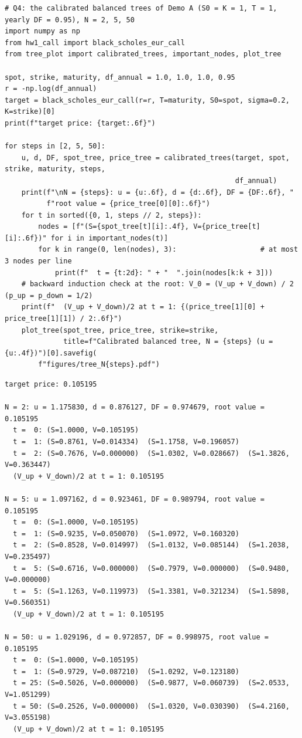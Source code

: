 \documentclass[11pt,a4paper]{article}
\begin{document}
\par\smallskip\noindent\begin{minipage}{\linewidth}\begin{lstlisting}[style=pysmall,title={run (\texttt{trees\_demo.py})}]
# Q4: the calibrated balanced trees of Demo A (S0 = K = 1, T = 1, yearly DF = 0.95), N = 2, 5, 50
import numpy as np
from hw1_call import black_scholes_eur_call
from tree_plot import calibrated_trees, important_nodes, plot_tree

spot, strike, maturity, df_annual = 1.0, 1.0, 1.0, 0.95
r = -np.log(df_annual)
target = black_scholes_eur_call(r=r, T=maturity, S0=spot, sigma=0.2, K=strike)[0]
print(f"target price: {target:.6f}")

for steps in [2, 5, 50]:
    u, d, DF, spot_tree, price_tree = calibrated_trees(target, spot, strike, maturity, steps,
                                                       df_annual)
    print(f"\nN = {steps}: u = {u:.6f}, d = {d:.6f}, DF = {DF:.6f}, "
          f"root value = {price_tree[0][0]:.6f}")
    for t in sorted({0, 1, steps // 2, steps}):
        nodes = [f"(S={spot_tree[t][i]:.4f}, V={price_tree[t][i]:.6f})" for i in important_nodes(t)]
        for k in range(0, len(nodes), 3):                    # at most 3 nodes per line
            print(f"  t = {t:2d}: " + "  ".join(nodes[k:k + 3]))
    # backward induction check at the root: V_0 = (V_up + V_down) / 2 (p_up = p_down = 1/2)
    print(f"  (V_up + V_down)/2 at t = 1: {(price_tree[1][0] + price_tree[1][1]) / 2:.6f}")
    plot_tree(spot_tree, price_tree, strike=strike,
              title=f"Calibrated balanced tree, N = {steps} (u = {u:.4f})")[0].savefig(
        f"figures/tree_N{steps}.pdf")
\end{lstlisting}
\begin{lstlisting}[style=out,title={output (\texttt{trees\_demo.out})}]
target price: 0.105195

N = 2: u = 1.175830, d = 0.876127, DF = 0.974679, root value = 0.105195
  t =  0: (S=1.0000, V=0.105195)
  t =  1: (S=0.8761, V=0.014334)  (S=1.1758, V=0.196057)
  t =  2: (S=0.7676, V=0.000000)  (S=1.0302, V=0.028667)  (S=1.3826, V=0.363447)
  (V_up + V_down)/2 at t = 1: 0.105195

N = 5: u = 1.097162, d = 0.923461, DF = 0.989794, root value = 0.105195
  t =  0: (S=1.0000, V=0.105195)
  t =  1: (S=0.9235, V=0.050070)  (S=1.0972, V=0.160320)
  t =  2: (S=0.8528, V=0.014997)  (S=1.0132, V=0.085144)  (S=1.2038, V=0.235497)
  t =  5: (S=0.6716, V=0.000000)  (S=0.7979, V=0.000000)  (S=0.9480, V=0.000000)
  t =  5: (S=1.1263, V=0.119973)  (S=1.3381, V=0.321234)  (S=1.5898, V=0.560351)
  (V_up + V_down)/2 at t = 1: 0.105195

N = 50: u = 1.029196, d = 0.972857, DF = 0.998975, root value = 0.105195
  t =  0: (S=1.0000, V=0.105195)
  t =  1: (S=0.9729, V=0.087210)  (S=1.0292, V=0.123180)
  t = 25: (S=0.5026, V=0.000000)  (S=0.9877, V=0.060739)  (S=2.0533, V=1.051299)
  t = 50: (S=0.2526, V=0.000000)  (S=1.0320, V=0.030390)  (S=4.2160, V=3.055198)
  (V_up + V_down)/2 at t = 1: 0.105195
\end{lstlisting}\end{minipage}\par\smallskip
\end{document}
